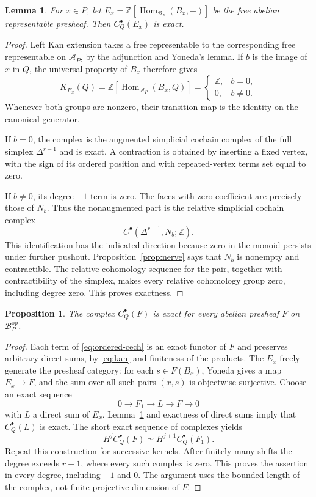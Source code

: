 \documentclass[11pt]{article}
\newtheorem{proposition}[theorem]{Proposition}
\newtheorem{lemma}[theorem]{Lemma}
\theoremstyle{definition}
\theoremstyle{remark}
\newcommand{\Z}{\mathbb Z}
\newcommand{\Hom}{\operatorname{Hom}}
\newcommand{\cA}{\mathcal A}
\newcommand{\cB}{\mathcal B}
\begin{document}
\begin{lemma}\label{lem:free-cech}
For $x\in P$, let $E_x=\Z[\Hom_{\cB_P}(B_x,-)]$ be the free abelian representable presheaf. Then $C_Q^\bullet(E_x)$ is exact.
\end{lemma}

\begin{proof}
Left Kan extension takes a free representable to the corresponding free representable on $\cA_P$, by the adjunction and Yoneda's lemma. If $b$ is the image of $x$ in $Q$, the universal property of $B_x$ therefore gives
\[
 K_{E_x}(Q)=\Z[\Hom_{\cA_P}(B_x,Q)]
 =\begin{cases}\Z,&b=0,\\0,&b\neq0.\end{cases}
\]
Whenever both groups are nonzero, their transition map is the identity on the canonical generator.

If $b=0$, the complex is the augmented simplicial cochain complex of the full simplex $\Delta^{r-1}$ and is exact. A contraction is obtained by inserting a fixed vertex, with the sign of its ordered position and with repeated-vertex terms set equal to zero.

If $b\neq0$, its degree $-1$ term is zero. The faces with zero coefficient are precisely those of $N_b$. Thus the nonaugmented part is the relative simplicial cochain complex
\[
 C^\bullet(\Delta^{r-1},N_b;\Z).
\]
This identification has the indicated direction because zero in the monoid persists under further pushout. Proposition~\ref{prop:nerve} says that $N_b$ is nonempty and contractible. The relative cohomology sequence for the pair, together with contractibility of the simplex, makes every relative cohomology group zero, including degree zero. This proves exactness.
\end{proof}

\begin{proposition}\label{prop:all-cech}
The complex $C_Q^\bullet(F)$ is exact for every abelian presheaf $F$ on $\cB_P^{\mathrm{op}}$.
\end{proposition}

\begin{proof}
Each term of \eqref{eq:ordered-cech} is an exact functor of $F$ and preserves arbitrary direct sums, by \eqref{eq:kan} and finiteness of the products. The $E_x$ freely generate the presheaf category: for each $s\in F(B_x)$, Yoneda gives a map $E_x\to F$, and the sum over all such pairs $(x,s)$ is objectwise surjective. Choose an exact sequence
\[
 0\longrightarrow F_1\longrightarrow L\longrightarrow F\longrightarrow0
\]
with $L$ a direct sum of $E_x$. Lemma~\ref{lem:free-cech} and exactness of direct sums imply that $C_Q^\bullet(L)$ is exact. The short exact sequence of complexes yields
\[
 H^j C_Q^\bullet(F)\simeq H^{j+1}C_Q^\bullet(F_1).
\]
Repeat this construction for successive kernels. After finitely many shifts the degree exceeds $r-1$, where every such complex is zero. This proves the assertion in every degree, including $-1$ and $0$. The argument uses the bounded length of the complex, not finite projective dimension of $F$.
\end{proof}
\end{document}
